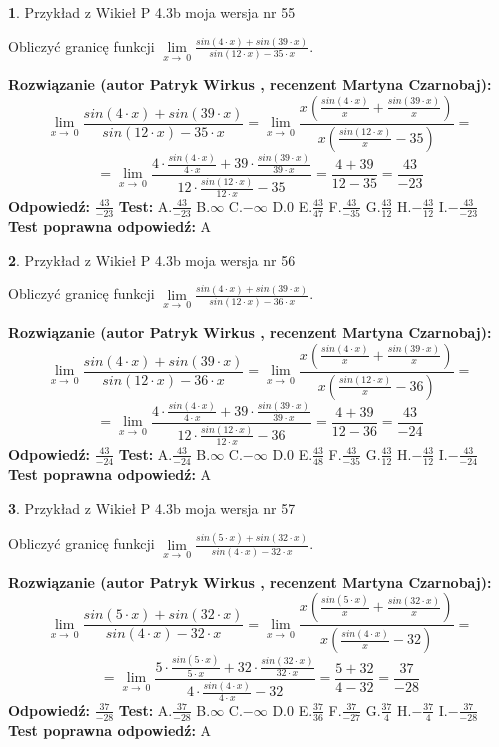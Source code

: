 \documentclass[12pt, a4paper]{article}
\theoremstyle{definition} %
\newtheorem{zad}{}
\newcommand{\zadStart}[1]{\begin{zad}#1\newline}
\newcommand{\zadStop}{\end{zad}}
\newcommand{\rozwStart}[2]{\noindent \textbf{Rozwiązanie (autor #1 , recenzent #2): }\newline}
\newcommand{\rozwStop}{\newline}
\newcommand{\odpStart}{\noindent \textbf{Odpowiedź:}\newline}
\newcommand{\odpStop}{\newline}
\newcommand{\testStart}{\noindent \textbf{Test:}\newline}
\newcommand{\testStop}{\newline}
\newcommand{\kluczStart}{\noindent \textbf{Test poprawna odpowiedź:}\newline}
\newcommand{\kluczStop}{\newline}
\begin{document}
\zadStart{Przykład z Wikieł P 4.3b moja wersja nr 55}


Obliczyć granicę funkcji $\lim\limits_{x\to\ 0}\frac{sin(4 \cdot x)+sin(39 \cdot x)}{sin(12 \cdot x)-35 \cdot x}$.
\zadStop
\rozwStart{Patryk Wirkus}{Martyna Czarnobaj}
$$\lim\limits_{x\to\ 0}\frac{sin(4 \cdot x)+sin(39 \cdot x)}{sin(12 \cdot x)-35 \cdot x}=\lim\limits_{x\to\ 0}\frac{x(\frac{sin(4 \cdot x)}{x}+\frac{sin(39 \cdot x)}{x})}{x(\frac{sin(12 \cdot x)}{x}-35)}=$$
$$=\lim\limits_{x\to\ 0}\frac{4 \cdot \frac{sin(4 \cdot x)}{4 \cdot x}+39 \cdot \frac{sin(39 \cdot x)}{39 \cdot x}}{12 \cdot \frac{sin(12 \cdot x)}{12 \cdot x}-35}=\frac{4+39}{12-35} = \frac{43}{-23}$$
\rozwStop
\odpStart
$\frac{43}{-23}$
\odpStop
\testStart
A.$\frac{43}{-23}$
B.$\infty$
C.$-\infty$
D.$0$
E.$\frac{43}{47}$
F.$\frac{43}{-35}$
G.$\frac{43}{12}$
H.$-\frac{43}{12}$
I.$-\frac{43}{-23}$
\testStop
\kluczStart
A
\kluczStop



\zadStart{Przykład z Wikieł P 4.3b moja wersja nr 56}


Obliczyć granicę funkcji $\lim\limits_{x\to\ 0}\frac{sin(4 \cdot x)+sin(39 \cdot x)}{sin(12 \cdot x)-36 \cdot x}$.
\zadStop
\rozwStart{Patryk Wirkus}{Martyna Czarnobaj}
$$\lim\limits_{x\to\ 0}\frac{sin(4 \cdot x)+sin(39 \cdot x)}{sin(12 \cdot x)-36 \cdot x}=\lim\limits_{x\to\ 0}\frac{x(\frac{sin(4 \cdot x)}{x}+\frac{sin(39 \cdot x)}{x})}{x(\frac{sin(12 \cdot x)}{x}-36)}=$$
$$=\lim\limits_{x\to\ 0}\frac{4 \cdot \frac{sin(4 \cdot x)}{4 \cdot x}+39 \cdot \frac{sin(39 \cdot x)}{39 \cdot x}}{12 \cdot \frac{sin(12 \cdot x)}{12 \cdot x}-36}=\frac{4+39}{12-36} = \frac{43}{-24}$$
\rozwStop
\odpStart
$\frac{43}{-24}$
\odpStop
\testStart
A.$\frac{43}{-24}$
B.$\infty$
C.$-\infty$
D.$0$
E.$\frac{43}{48}$
F.$\frac{43}{-35}$
G.$\frac{43}{12}$
H.$-\frac{43}{12}$
I.$-\frac{43}{-24}$
\testStop
\kluczStart
A
\kluczStop



\zadStart{Przykład z Wikieł P 4.3b moja wersja nr 57}


Obliczyć granicę funkcji $\lim\limits_{x\to\ 0}\frac{sin(5 \cdot x)+sin(32 \cdot x)}{sin(4 \cdot x)-32 \cdot x}$.
\zadStop
\rozwStart{Patryk Wirkus}{Martyna Czarnobaj}
$$\lim\limits_{x\to\ 0}\frac{sin(5 \cdot x)+sin(32 \cdot x)}{sin(4 \cdot x)-32 \cdot x}=\lim\limits_{x\to\ 0}\frac{x(\frac{sin(5 \cdot x)}{x}+\frac{sin(32 \cdot x)}{x})}{x(\frac{sin(4 \cdot x)}{x}-32)}=$$
$$=\lim\limits_{x\to\ 0}\frac{5 \cdot \frac{sin(5 \cdot x)}{5 \cdot x}+32 \cdot \frac{sin(32 \cdot x)}{32 \cdot x}}{4 \cdot \frac{sin(4 \cdot x)}{4 \cdot x}-32}=\frac{5+32}{4-32} = \frac{37}{-28}$$
\rozwStop
\odpStart
$\frac{37}{-28}$
\odpStop
\testStart
A.$\frac{37}{-28}$
B.$\infty$
C.$-\infty$
D.$0$
E.$\frac{37}{36}$
F.$\frac{37}{-27}$
G.$\frac{37}{4}$
H.$-\frac{37}{4}$
I.$-\frac{37}{-28}$
\testStop
\kluczStart
A
\kluczStop
\end{document}
